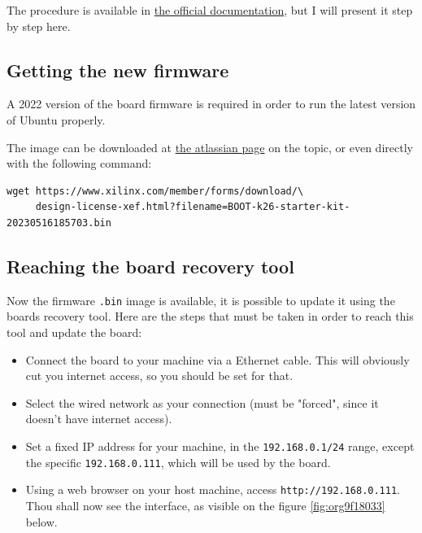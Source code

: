 \documentclass[10pt]{article}
\begin{document}
The procedure is available in \href{https://docs.xilinx.com/r/en-US/ug1089-kv260-starter-kit/Firmware-Update}{the official documentation},
but I will present it step by step here.

\subsection{Getting the new firmware}
\label{sec:orgc7f419b}
A 2022 version of the board firmware is required in order to run the latest
version of Ubuntu properly.

The image can be downloaded at \href{https://xilinx-wiki.atlassian.net/wiki/spaces/A/pages/1641152513/Kria+K26+ SOMoot-FW-update-with-xmutil}{the atlassian page} on the topic,
or even directly with the following command:

\begin{verbatim}
wget https://www.xilinx.com/member/forms/download/\
     design-license-xef.html?filename=BOOT-k26-starter-kit-20230516185703.bin
\end{verbatim}


\subsection{Reaching the board recovery tool}
\label{sec:org65acb26}
Now the firmware \texttt{.bin} image is available, it is possible to update it using the
boards recovery tool. Here are the steps that must be taken in order to reach
this tool and update the board:

\begin{itemize}
\item Connect the board to your machine via a Ethernet cable.
This will obviously cut you internet access, so you should be set for that.
\item Select the wired network as your connection (must be "forced", since it
doesn't have internet access).
\item Set a fixed IP address for your machine, in the \texttt{192.168.0.1/24}
range, except the specific \texttt{192.168.0.111}, which will be used by the
board.
\item Using a web browser on your host machine, access
\texttt{http://192.168.0.111}. Thou shall now see the interface, as visible on
the figure \ref{fig:org9f18033} below.
\end{itemize}
\end{document}
